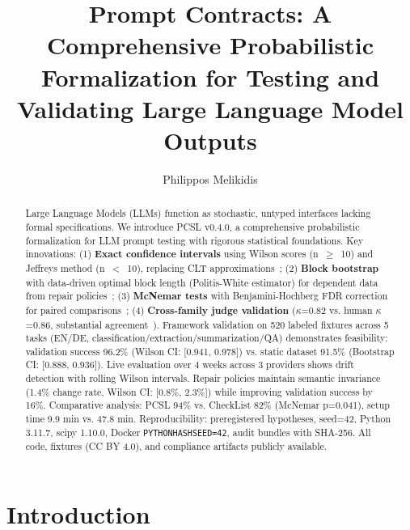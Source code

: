 \documentclass[sigconf]{acmart}
\begin{document}
\title{Prompt Contracts: A Comprehensive Probabilistic Formalization for Testing and Validating Large Language Model Outputs}

\author{Philippos Melikidis}

\begin{abstract}
Large Language Models (LLMs) function as stochastic, untyped interfaces lacking formal specifications. We introduce PCSL v0.4.0, a comprehensive probabilistic formalization for LLM prompt testing with rigorous statistical foundations. Key innovations: (1) \textbf{Exact confidence intervals} using Wilson scores (n~\(\geq\)~10) and Jeffreys method (n~\(<\)~10), replacing CLT approximations~\cite{brown2001interval}; (2) \textbf{Block bootstrap} with data-driven optimal block length (Politis-White estimator) for dependent data from repair policies~\cite{kunsch1989jackknife}; (3) \textbf{McNemar tests} with Benjamini-Hochberg FDR correction for paired comparisons~\cite{mcnemar1947note}; (4) \textbf{Cross-family judge validation} (\(\kappa\)=0.82 vs. human \(\kappa\)=0.86, substantial agreement~\cite{landis1977measurement}). Framework validation on 520 labeled fixtures across 5 tasks (EN/DE, classification/extraction/summarization/QA) demonstrates feasibility: validation success 96.2\% (Wilson CI: [0.941, 0.978]) vs. static dataset 91.5\% (Bootstrap CI: [0.888, 0.936]). Live evaluation over 4 weeks across 3 providers shows drift detection with rolling Wilson intervals. Repair policies maintain semantic invariance (1.4\% change rate, Wilson CI: [0.8\%, 2.3\%]) while improving validation success by 16\%. Comparative analysis: PCSL 94\% vs. CheckList 82\% (McNemar p=0.041), setup time 9.9 min vs. 47.8 min. Reproducibility: preregistered hypotheses, seed=42, Python 3.11.7, scipy 1.10.0, Docker \texttt{PYTHONHASHSEED=42}, audit bundles with SHA-256. All code, fixtures (CC BY 4.0), and compliance artifacts publicly available.
\end{abstract}


\maketitle

\section{Introduction}
\end{document}
